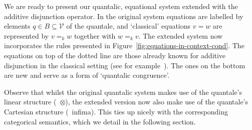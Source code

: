 \documentclass[a4paper,UKenglish,cleveref, autoref, thm-restate]{lipics-v2021}
\begin{document}
We are ready to present our quantalic, equational system extended with the additive
disjunction operator.  In the original system equations are
labelled by elements $q \in B \subseteq \mathcal{V}$ of the quantale, and 
`classical' equations $v = w$ are represented by $v =_k w$ together with $w =_k
v$. The extended system now incorporates the rules presented in
Figure~\ref{fig:equations-in-context-cond}. The equations on top of the dotted
line are those already known for additive disjunction in the classical setting
(see for example~\cite{croleCategoriesTypes1994}). The ones on the bottom are
new and serve as a form of `quantalic congruence'. 

Observe that whilst the original quantalic system makes use of the quantale's
linear structure (\ie\ $\otimes$), the extended version now also make use of
the quantale's Cartesian structure (\ie\ infima). This ties up nicely with the
corresponding categorical semantics, which we detail in the following section.
\end{document}
